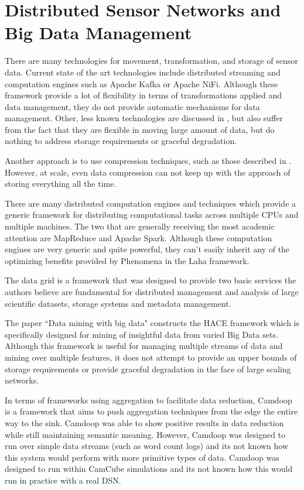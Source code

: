 \section{Distributed Sensor Networks and Big Data Management}\label{sec:distributed-sensor-networks-and-big-data-management}
There are many technologies for movement, transformation, and storage of sensor data. Current state of the art technologies include distributed streaming and computation engines such as Apache Kafka\cite{kreps2011kafka} or Apache NiFi\cite{noauthor_apache_nodate}. Although these framework provide a lot of flexibility in terms of transformations applied and data management, they do not provide automatic mechanisms for data management. Other, less known technologies are discussed in \cite{hughes2016survey}, but also suffer from the fact that they are flexible in moving large amount of data, but do nothing to address storage requirements or graceful degradation.

Another approach is to use compression techniques, such as those described in \cite{tang2004compression}. However, at scale, even data compression can not keep up with the approach of storing everything all the time.

There are many distributed computation engines and techniques which provide a generic framework for distributing computational tasks across multiple CPUs and multiple machines. The two that are generally receiving the most academic attention are MapReduce\cite{dean2008mapreduce} and Apache Spark\cite{zaharia2016apache}. Although these computation engines are very generic and quite powerful, they can't easily inherit any of the optimizing benefits provided by Phenomena in the Laha framework.

The data grid\cite{chervenak2000data} is a framework that was designed to provide two basic services the authors believe are fundamental for distributed management and analysis of large scientific datasets, storage systems and metadata management.

The paper ``Data mining with big data"\cite{wu2014data} constructs the HACE framework which is specifically designed for mining of insightful data from varied Big Data sets. Although this framework is useful for managing multiple streams of data and mining over multiple features, it does not attempt to provide an upper bounds of storage requirements or provide graceful degradation in the face of large scaling networks.

In terms of frameworks using aggregation to facilitate data reduction, Camdoop\cite{costa2012camdoop} is a framework that aims to push aggregation techniques from the edge the entire way to the sink. Camdoop was able to show positive results in data reduction while still maintaining semantic meaning. However, Camdoop was designed to run over simple data streams (such as word count logs) and its not known how this system would perform with more primitive types of data. Camdoop was designed to run within CamCube simulations and its not known how this would run in practice with a real DSN.

